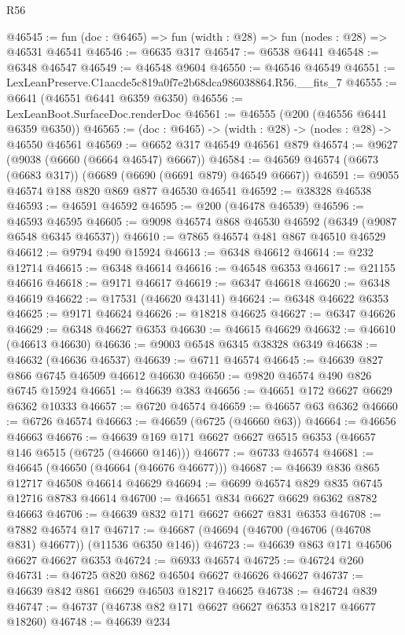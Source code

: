 \begin{lexlean}{R56}
\begin{coremodule}
@46545 := fun (doc : @6465) => fun (width : @28) => fun (nodes : @28) => @46531 @46541
@46546 := @6635 @317
@46547 := @6538 @6441
@46548 := @6348 @46547
@46549 := @46548 @9604
@46550 := @46546 @46549
@46551 := LexLeanPreserve.C1aacde5c819a0f7e2b68dca986038864.R56.__fits_7
@46555 := @6641 (@46551 @6441 @6359 @6350)
@46556 := LexLeanBoot.SurfaceDoc.renderDoc
@46561 := @46555 (@200 (@46556 @6441 @6359 @6350))
@46565 := (doc : @6465) -> (width : @28) -> (nodes : @28) -> @46550 @46561
@46569 := @6652 @317 @46549 @46561 @879
@46574 := @9627 (@9038 (@6660 (@6664 @46547) @6667))
@46584 := @46569 @46574 (@6673 (@6683 @317)) (@6689 (@6690 (@6691 @879) @46549 @6667))
@46591 := @9055 @46574 @188 @820 @869 @877 @46530 @46541
@46592 := @38328 @46538
@46593 := @46591 @46592
@46595 := @200 (@46478 @46539)
@46596 := @46593 @46595
@46605 := @9098 @46574 @868 @46530 @46592 (@6349 (@9087 @6548 @6345 @46537))
@46610 := @7865 @46574 @481 @867 @46510 @46529
@46612 := @9794 @490 @15924
@46613 := @6348 @46612
@46614 := @232 @12714
@46615 := @6348 @46614
@46616 := @46548 @6353
@46617 := @21155 @46616
@46618 := @9171 @46617
@46619 := @6347 @46618
@46620 := @6348 @46619
@46622 := @17531 (@46620 @43141)
@46624 := @6348 @46622 @6353
@46625 := @9171 @46624
@46626 := @18218 @46625
@46627 := @6347 @46626
@46629 := @6348 @46627 @6353
@46630 := @46615 @46629
@46632 := @46610 (@46613 @46630)
@46636 := @9003 @6548 @6345 @38328 @6349
@46638 := @46632 (@46636 @46537)
@46639 := @6711 @46574
@46645 := @46639 @827 @866 @6745 @46509 @46612 @46630
@46650 := @9820 @46574 @490 @826 @6745 @15924
@46651 := @46639 @383
@46656 := @46651 @172 @6627 @6629 @6362 @10333
@46657 := @6720 @46574
@46659 := @46657 @63 @6362
@46660 := @6726 @46574
@46663 := @46659 (@6725 (@46660 @63))
@46664 := @46656 @46663
@46676 := @46639 @169 @171 @6627 @6627 @6515 @6353 (@46657 @146 @6515 (@6725 (@46660 @146)))
@46677 := @6733 @46574
@46681 := @46645 (@46650 (@46664 (@46676 @46677)))
@46687 := @46639 @836 @865 @12717 @46508 @46614 @46629
@46694 := @6699 @46574 @829 @835 @6745 @12716 @8783 @46614
@46700 := @46651 @834 @6627 @6629 @6362 @8782 @46663
@46706 := @46639 @832 @171 @6627 @6627 @831 @6353
@46708 := @7882 @46574 @17
@46717 := @46687 (@46694 (@46700 (@46706 (@46708 @831) @46677)) (@11536 @6350 @146))
@46723 := @46639 @863 @171 @46506 @6627 @46627 @6353
@46724 := @6933 @46574
@46725 := @46724 @260
@46731 := @46725 @820 @862 @46504 @6627 @46626 @46627
@46737 := @46639 @842 @861 @6629 @46503 @18217 @46625
@46738 := @46724 @839
@46747 := @46737 (@46738 @82 @171 @6627 @6627 @6353 @18217 @46677 @18260)
@46748 := @46639 @234

\end{coremodule}
\end{lexlean}
